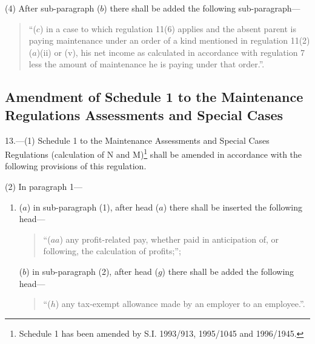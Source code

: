 \documentclass[12pt,a4paper]{article}
\begin{document}
(4) After sub-paragraph ($b$) there shall be added the following sub-\hspace{0pt}paragraph—
\begin{quotation}
“($c$) in a case to which regulation 11(6) applies and the absent parent is paying maintenance under an order of a kind mentioned in regulation 11(2)($a$)(ii) or (v), his net income as calculated in accordance with regulation 7 less the amount of maintenance he is paying under that order.”.
\end{quotation}

\subsection[13. Amendment of Schedule 1 to the Maintenance Regulations Assessments and Special Cases]{Amendment of Schedule 1 to the Maintenance Regulations Assessments and Special Cases}

13.—(1) Schedule 1 to the Maintenance Assessments and Special Cases Regulations (calculation of N and M)\footnote{\frenchspacing Schedule 1 has been amended by S.I. 1993/913, 1995/1045 and 1996/1945.} shall be amended in accordance with the following provisions of this regulation.

(2) In paragraph 1—
\begin{enumerate}\item[]
($a$) in sub-paragraph (1), after head ($a$) there shall be inserted the following head—
\begin{quotation}
“($aa$) any profit-related pay, whether paid in anticipation of, or following, the calculation of profits;”;
\end{quotation}

($b$) in sub-paragraph (2), after head ($g$) there shall be added the following head—
\begin{quotation}
“($h$) any tax-exempt allowance made by an employer to an employee.”.
\end{quotation}
\end{enumerate}
\end{document}
